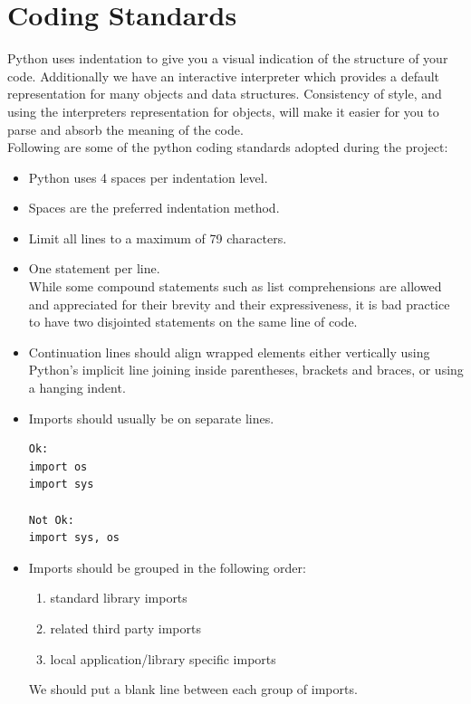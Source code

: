 \section{Coding Standards}
Python uses indentation to give you a visual indication of the structure of your code. Additionally we have an interactive interpreter which provides a default representation for many objects and data structures. Consistency of style, and using the interpreters representation for objects, will make it easier for you to parse and absorb the meaning of the code.\\
Following are some of the python coding standards adopted during the project:
\begin{itemize}
	\item Python uses 4 spaces per indentation level.
	\item Spaces are the preferred indentation method.
	\item Limit all lines to a maximum of 79 characters.
	\item One statement per line.\\
	While some compound statements such as list comprehensions are allowed and appreciated for their brevity and their expressiveness, it is bad practice to have two disjointed statements on the same line of code.
	\item Continuation lines should align wrapped elements either vertically using Python's implicit line joining inside parentheses, brackets and braces, or using a hanging indent.
	\item Imports should usually be on separate lines.
	\begin{lstlisting}
Ok:
import os
import sys

Not Ok:
import sys, os
	\end{lstlisting}
	\item Imports should be grouped in the following order:
	
	\begin{enumerate}
		\item standard library imports
		\item related third party imports
		\item local application/library specific imports
	\end{enumerate}
	We should put a blank line between each group of imports.
\end{itemize}
\pagebreak

